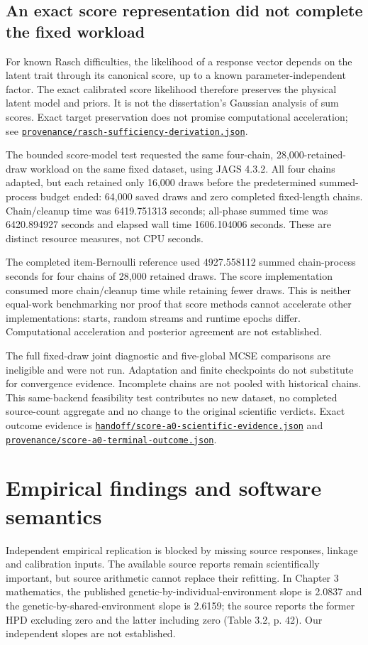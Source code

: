 \documentclass[11pt]{article}
\newcommand{\file}[1]{\href{https://github.com/alectionary/vibe-math/blob/master/formalization/schwabe-psychometric-genetics/#1}{\nolinkurl{#1}}}
\begin{document}
\subsection{An exact score representation did not complete the fixed workload}
For known Rasch difficulties, the likelihood of a response vector depends on the latent trait through its canonical score, up to a known parameter-independent factor. The exact calibrated score likelihood therefore preserves the physical latent model and priors. It is not the dissertation's Gaussian analysis of sum scores. Exact target preservation does not promise computational acceleration; see \file{provenance/rasch-sufficiency-derivation.json}.

The bounded score-model test requested the same four-chain, 28,000-retained-draw workload on the same fixed dataset, using JAGS 4.3.2. All four chains adapted, but each retained only 16,000 draws before the predetermined summed-process budget ended: 64,000 saved draws and zero completed fixed-length chains. Chain/cleanup time was 6419.751313 seconds; all-phase summed time was 6420.894927 seconds and elapsed wall time 1606.104006 seconds. These are distinct resource measures, not CPU seconds.

The completed item-Bernoulli reference used 4927.558112 summed chain-process seconds for four chains of 28,000 retained draws. The score implementation consumed more chain/cleanup time while retaining fewer draws. This is neither equal-work benchmarking nor proof that score methods cannot accelerate other implementations: starts, random streams and runtime epochs differ. Computational acceleration and posterior agreement are not established.

The full fixed-draw joint diagnostic and five-global MCSE comparisons are ineligible and were not run. Adaptation and finite checkpoints do not substitute for convergence evidence. Incomplete chains are not pooled with historical chains. This same-backend feasibility test contributes no new dataset, no completed source-count aggregate and no change to the original scientific verdicts. Exact outcome evidence is \file{handoff/score-a0-scientific-evidence.json} and \file{provenance/score-a0-terminal-outcome.json}.

\section{Empirical findings and software semantics}\label{sec:empirical}
Independent empirical replication is blocked by missing source responses, linkage and calibration inputs. The available source reports remain scientifically important, but source arithmetic cannot replace their refitting. In Chapter 3 mathematics, the published genetic-by-individual-environment slope is 2.0837 and the genetic-by-shared-environment slope is 2.6159; the source reports the former HPD excluding zero and the latter including zero (Table 3.2, p. 42). Our independent slopes are not established.
\end{document}
